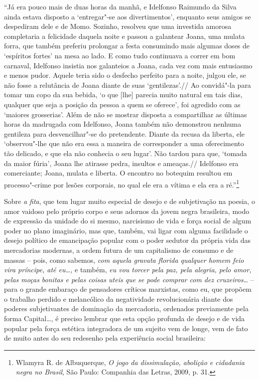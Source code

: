 ``Já era pouco mais de duas horas da manhã, e Idelfonso Raimundo da
Silva ainda estava disposto a `entregar"-se aos divertimentos', enquanto
seus amigos se despediram dele e de Momo. Sozinho, resolveu que uma
investida amorosa completaria a felicidade daquela noite e passou a
galantear Joana, uma mulata forra, que também preferiu prolongar a festa
consumindo mais algumas doses de `espíritos fortes' na mesa ao lado. E
como tudo continuava a correr em bom carnaval, Idelfonso insistia nos
galanteios a Joana, cada vez com mais entusiasmo e menos pudor. Aquele
teria sido o desfecho perfeito para a noite, julgou ele, se não fosse a
relutância de Joana diante de suas `gentilezas'.// Ao convidá"-la para
tomar um copo da sua bebida, `o que {[}lhe{]} parecia muito natural em
tais dias, qualquer que seja a posição da pessoa a quem se oferece', foi
agredido com as `maiores grosserias'. Além de não se mostrar disposta a
compartilhar as últimas horas da madrugada com Idelfonso, Joana também
não demonstrou nenhuma gentileza para desvencilhar"-se do pretendente.
Diante da recusa da liberta, ele `observou"-lhe que não era essa a
maneira de corresponder a uma oferecimento tão delicado, e que ela não
conhecia o seu lugar'. Não tardou para que, `tomada da maior fúria',
Joana lhe atirasse pedra, insultos e ameaças.// Idelfonso era
comerciante; Joana, mulata e liberta. O encontro no botequim resultou em
processo"-crime por lesões corporais, no qual ele era a vítima e ela era
a ré.''\footnote{Wlamyra R. de Albuquerque, \emph{O jogo da
  dissimulação, abolição e cidadania negra no Brasil}, São Paulo:
  Companhia das Letras, 2009, p. 31.}

Sobre \emph{a fita}, que tem lugar muito especial de desejo e de
subjetivação na poesia, o amor vaidoso pelo próprio corpo e seus adornos
da jovem negra brasileira, modo de expressão da unidade do si mesmo,
narcisismo de vida e força social de algum poder no plano imaginário,
mas que, também, vai ligar com alguma facilidade o desejo político de
emancipação popular com o poder sedutor da própria vida das mercadorias
modernas, a ordem futura de um capitalismo de consumo e de massas --
pois, como sabemos, \emph{com aquela gravata florida qualquer homem feio
vira príncipe, até eu\ldots{},} e também, \emph{eu vou torcer pela paz, pela
alegria, pelo amor, pelas moças bonitas e pelas coisas uteis que se pode
comprar com dez cruzeiros\ldots{}} -- para o grande embaraço de pensadores
críticos marxistas, como eu, que propõem o trabalho perdido e
melancólico da negatividade revolucionária diante dos poderes
subjetivantes de dominação da mercadoria, ordenados previamente pela
forma Capital\ldots{}, é preciso lembrar que esta opção profunda de desejo e
de vida popular pela força estética integradora de um sujeito vem de
longe, vem de fato de muito antes do seu redesenho pela experiência
social brasileira:

